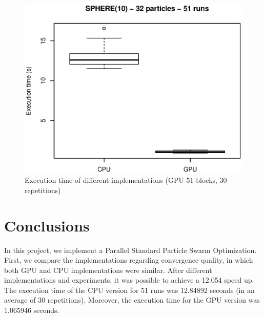 \documentclass{article}
\begin{document}
    \begin{figure}[!htb]
        \centering
        \includegraphics[width=.7\textwidth]{../img/sphere10_32particles_multi_runs_time.eps}
        \caption{Execution time of different implementations (GPU 51-blocks, 30 repetitions)}
        \label{fig:sphere10_32particles_multi_runs_time}
    \end{figure}

    \section{Conclusions}

    In this project, we implement a Parallel Standard Particle Swarm Optimization.
    First, we compare the implementations regarding convergence quality, in which both GPU and CPU implementations were similar.
    After different implementations and experiments, it was possible to achieve a 12.054 speed up. The execution time of the CPU version for 51 runs was 12.84892 seconds (in an average of 30 repetitions). Moreover, the execution time for the GPU version was 1.065946 seconds.

    
     
\end{document}
